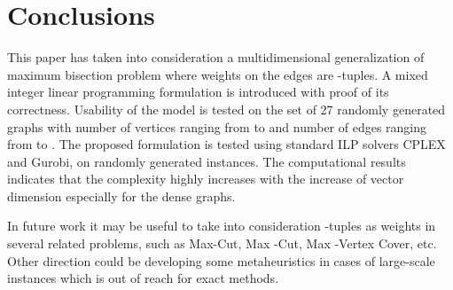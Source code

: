 \documentclass[10pt]{article}
\begin{document}
\section{Conclusions}

This paper has taken into consideration a multidimensional generalization of maximum bisection problem where
weights on the edges are -tuples. A mixed integer linear programming formulation
is introduced with proof of its correctness. Usability of the model is tested on the set of 27 randomly generated graphs with number of vertices ranging from  to  and number of edges ranging from  to . The proposed formulation is tested using standard ILP solvers CPLEX and Gurobi, on randomly generated instances. The computational results indicates that the complexity highly increases with the increase of vector dimension especially for the dense graphs.

In future work it may be useful to take into consideration -tuples as weights in several 
related problems, such as Max-Cut, Max -Cut, Max -Vertex Cover, etc.  Other direction could be developing some metaheuristics in cases of large-scale instances which is out of reach for exact methods.
\end{document}
